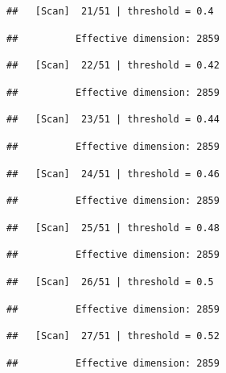 \documentclass[
]{book}
\begin{document}
\begin{verbatim}
##   [Scan]  21/51 | threshold = 0.4
\end{verbatim}

\begin{verbatim}
##          Effective dimension: 2859
\end{verbatim}

\begin{verbatim}
##   [Scan]  22/51 | threshold = 0.42
\end{verbatim}

\begin{verbatim}
##          Effective dimension: 2859
\end{verbatim}

\begin{verbatim}
##   [Scan]  23/51 | threshold = 0.44
\end{verbatim}

\begin{verbatim}
##          Effective dimension: 2859
\end{verbatim}

\begin{verbatim}
##   [Scan]  24/51 | threshold = 0.46
\end{verbatim}

\begin{verbatim}
##          Effective dimension: 2859
\end{verbatim}

\begin{verbatim}
##   [Scan]  25/51 | threshold = 0.48
\end{verbatim}

\begin{verbatim}
##          Effective dimension: 2859
\end{verbatim}

\begin{verbatim}
##   [Scan]  26/51 | threshold = 0.5
\end{verbatim}

\begin{verbatim}
##          Effective dimension: 2859
\end{verbatim}

\begin{verbatim}
##   [Scan]  27/51 | threshold = 0.52
\end{verbatim}

\begin{verbatim}
##          Effective dimension: 2859
\end{verbatim}
\end{document}
